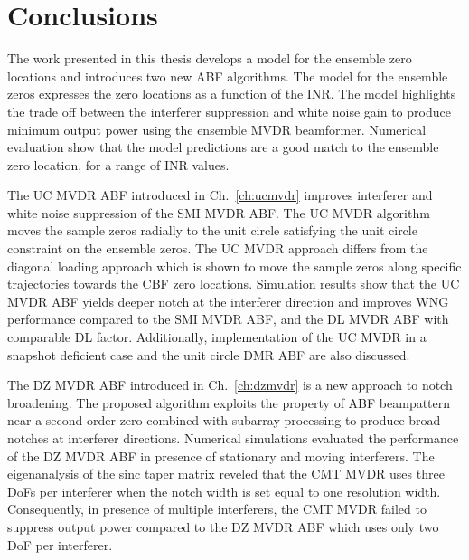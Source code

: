 
\chapter{Conclusions}
\label{ch:conclusion}
The work presented in this thesis develops a model for the ensemble
zero locations and introduces two new ABF algorithms. The model for
the ensemble zeros expresses the zero locations as a function of the
INR. The model highlights the trade off between the interferer
suppression and white noise gain to produce minimum output power using
the ensemble MVDR beamformer. Numerical evaluation show that the model
predictions are a good match to the ensemble zero location, for a
range of INR values.

The UC MVDR ABF introduced in Ch.~\ref{ch:ucmvdr} improves interferer
and white noise suppression of the SMI MVDR ABF. The UC MVDR algorithm
moves the sample zeros radially to the unit circle satisfying the unit
circle constraint on the ensemble zeros. The UC MVDR approach differs
from the diagonal loading approach which is shown to move the sample
zeros along specific trajectories towards the CBF zero
locations. Simulation results show that the UC MVDR ABF yields deeper
notch at the interferer direction and improves WNG performance
compared to the SMI MVDR ABF, and the DL MVDR ABF with comparable DL
factor. Additionally, implementation of the UC MVDR in a snapshot deficient case and the unit circle DMR ABF are also discussed.

The DZ MVDR ABF introduced in Ch.~\ref{ch:dzmvdr} is a new approach to
notch broadening. The proposed algorithm exploits the property of ABF
beampattern near a second-order zero combined with subarray processing
to produce broad notches at interferer directions. Numerical
simulations evaluated the performance of the DZ MVDR ABF in presence
of stationary and moving interferers. The eigenanalysis of the sinc
taper matrix reveled that the CMT MVDR uses three DoFs per interferer
when the notch width is set equal to one resolution
width. Consequently, in presence of multiple interferers, the CMT MVDR
failed to suppress output power compared to the DZ MVDR ABF which uses
only two DoF per interferer.

